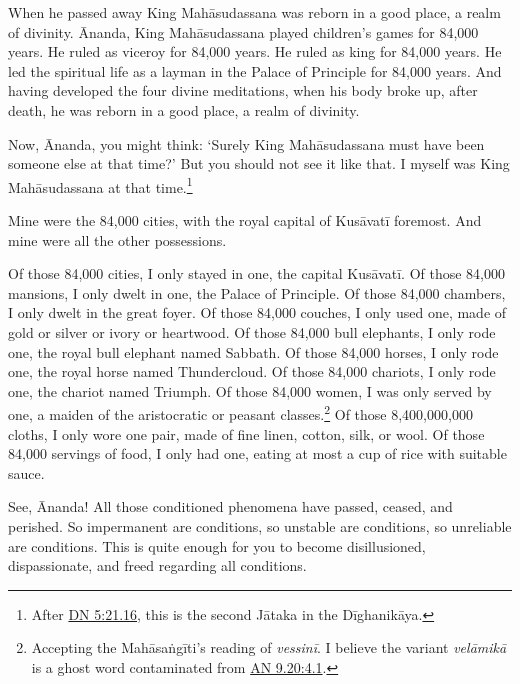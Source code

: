 \documentclass[12pt,openany]{book}%
\begin{document}
When he passed away King \textsanskrit{Mahāsudassana} was reborn in a good place, a realm of divinity. Ānanda, King \textsanskrit{Mahāsudassana} played children’s games for 84,000 years. He ruled as viceroy for 84,000 years. He ruled as king for 84,000 years. He led the spiritual life as a layman in the Palace of Principle for 84,000 years. And having developed the four divine meditations, when his body broke up, after death, he was reborn in a good place, a realm of divinity. 

Now, Ānanda, you might think: ‘Surely King \textsanskrit{Mahāsudassana} must have been someone else at that time?’ But you should not see it like that. I myself was King \textsanskrit{Mahāsudassana} at that time.\footnote{After \href{https://suttacentral.net/dn5/en/sujato\#21.16}{DN 5:21.16}, this is the second \textsanskrit{Jātaka} in the \textsanskrit{Dīghanikāya}. } 

Mine were the 84,000 cities, with the royal capital of \textsanskrit{Kusāvatī} foremost. And mine were all the other possessions. 

Of those 84,000 cities, I only stayed in one, the capital \textsanskrit{Kusāvatī}. Of those 84,000 mansions, I only dwelt in one, the Palace of Principle. Of those 84,000 chambers, I only dwelt in the great foyer. Of those 84,000 couches, I only used one, made of gold or silver or ivory or heartwood. Of those 84,000 bull elephants, I only rode one, the royal bull elephant named Sabbath. Of those 84,000 horses, I only rode one, the royal horse named Thundercloud. Of those 84,000 chariots, I only rode one, the chariot named Triumph. Of those 84,000 women, I was only served by one, a maiden of the aristocratic or peasant classes.\footnote{Accepting the \textsanskrit{Mahāsaṅgīti}’s reading of \textit{\textsanskrit{vessinī}}. I believe the variant \textit{\textsanskrit{velāmikā}} is a ghost word contaminated from \href{https://suttacentral.net/an9.20/en/sujato\#4.1}{AN 9.20:4.1}. } Of those 8,400,000,000 cloths, I only wore one pair, made of fine linen, cotton, silk, or wool. Of those 84,000 servings of food, I only had one, eating at most a cup of rice with suitable sauce. 

See, Ānanda! All those conditioned phenomena have passed, ceased, and perished. So impermanent are conditions, so unstable are conditions, so unreliable are conditions. This is quite enough for you to become disillusioned, dispassionate, and freed regarding all conditions. 
\end{document}
